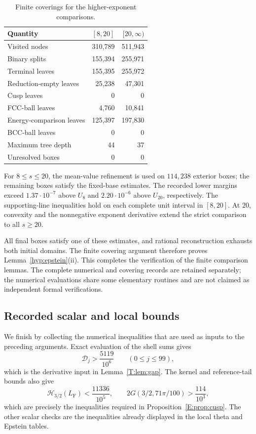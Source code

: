 \documentclass[reqno,english]{amsart}
\theoremstyle{definition}
\newtheorem{open problem}[theorem]{Open Problem}
\theoremstyle{remark}
\theoremstyle{plain}
\numberwithin{equation}{section}
\newcommand{\FCC}{L_{\mathrm F}}
\newcommand{\HH}{\mathcal H}
\begin{document}
\begin{table}[ht]\centering
\caption{Finite coverings for the higher-exponent comparisons.}\label{E:tab:power-trees}
\begin{tabular}{lrr}\toprule
Quantity&$[8,20]$&$[20,\infty)$\\\midrule
Visited nodes&310,789&511,943\\
Binary splits&155,394&255,971\\
Terminal leaves&155,395&255,972\\
Reduction-empty leaves&25,238&47,301\\
Cusp leaves&0&0\\
FCC-ball leaves&4,760&10,841\\
Energy-comparison leaves&125,397&197,830\\
BCC-ball leaves&0&0\\
Maximum tree depth&44&37\\
Unresolved boxes&0&0\\\bottomrule
\end{tabular}
\end{table}

For $8\le s\le20$, the mean-value refinement is used on $114,238$
exterior boxes; the remaining boxes satisfy the fixed-base estimates.
The recorded lower margins exceed $1.37\cdot10^{-7}$ above $U_8$
and $2.20\cdot10^{-6}$ above $U_{20}$, respectively. The
supporting-line inequalities hold on each complete unit interval in
$[8,20]$. At $20$, convexity and the nonnegative exponent derivative
extend the strict comparison to all $s\ge20$.

All final boxes satisfy one of these estimates, and rational
reconstruction exhausts both initial domains. The finite covering
argument therefore proves Lemma~\ref{hyp:epstein}\textup{(ii)}.
This completes the verification of the finite comparison lemmas.
The complete numerical and covering records are retained separately;
the numerical evaluations share some elementary routines and are not
claimed as independent formal verifications.

\subsection{Recorded scalar and local bounds}\label{app:elementary-revision}\label{T:app:reproduce}\label{T:app:source}\label{app:complete-sources}\label{sec:status}\label{app:fresh-execution}

We finish by collecting the numerical inequalities that are used as
inputs to the preceding arguments. Exact evaluation of the shell sums
gives
\[
 \mathscr D_j>\frac{5119}{10^6}\qquad(0\le j\le99),
\]
which is the derivative input in Lemma~\ref{T:lem:gap}. The kernel and
reference-tail bounds also give
\[
 \HH_{3/2}(\FCC)<\frac{11336}{10^5},
 \qquad 2G(3/2,71\pi/100)>\frac{114}{10^3},
\]
which are precisely the inequalities required in
Proposition~\ref{E:prop:cusp}. The other scalar checks are the inequalities
already displayed in the local theta and Epstein tables.
\end{document}
